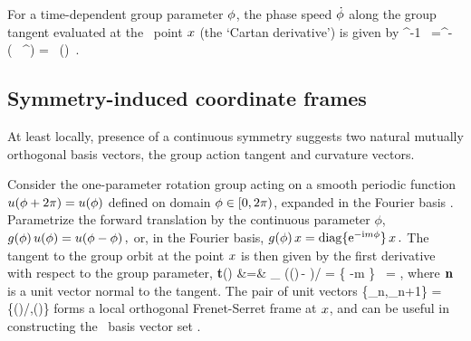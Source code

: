 													\toCB
For a time-dependent group parameter
${\bf \phi}$, the phase speed $\dot{{\bf \phi}}$ along the group tangent
evaluated at the \statesp\ point $\ssp$ (the `Cartan derivative') is
given by
\beq
\LieEl^{-1}\dot{\LieEl} \,\ssp %
     =^{-\gSpace \Lg} \,
\left( \, %
                             ^{\gSpace \Lg}\right)\ssp
    =\dot{\gSpace} \, \groupTan(\ssp)
\,.

\subsection{Symmetry-induced coordinate frames}
\label{s:symmIndCoo}

At least locally, presence of a continuous symmetry suggests two
natural mutually orthogonal basis vectors, the group action tangent and
curvature vectors.

Consider the one-parameter rotation group  acting on a smooth
periodic function $u(\gSpace + 2\pi) = u(\gSpace)$ defined on domain
$\gSpace \in [0,2\pi)$, expanded in the Fourier basis
.
Parametrize the forward
translation by the continuous parameter $\phi$,
\(
    \LieEl(\phi)\,u(\gSpace) = u(\gSpace-\phi)
\,,
\)
or, in the Fourier basis,
\(
   \LieEl(\phi) \,\ssp = \mathrm{diag}\{ \mathrm{e}^{-\mathrm{i}m\phi} \} \,\ssp
\,.
\)
The tangent to the group orbit at the point $\ssp$ is then given by
the first derivative with respect to the group parameter,
\bea
   {\bf t}(\ssp) &=&
   \lim_{\gSpace{}}
   \left(\LieEl(\gSpace)\,\ssp - \ssp\right)/\gSpace
   = \{ -m \} \, \ssp = \Lg \ssp,
\label{eq:tang}
\eea
where $\mathbf{n}$ is a unit vector normal to the tangent. The pair of unit vectors
    \PC{2011-10-28
    ``As $\Norm{\LieEl(\gSpace)\slicep}$ is a constant, for the group tangent
    vector $\Lg_\gSpace \slicep$ evaluated at $\slicep$ \refeq{eq:tang}
    $\braket{\slicep}{\Lg_\theta\,\slicep}$ vanishes ($\Lg_{\theta}$ is
    antisymmetric).''
The state vector $\ssp$ is not normal to \normVec(\ssp), as $\braket{\ssp
\Lg^2}{\ssp} = - \Norm{\groupTan(\ssp)}^2 \neq 0$, but can one use it to
produce from $\ssp$ the 3. local eigenbasis unit vector? Have not thought
that through. If we do that here, need to rewrite text leading to
\refeq{PCsectQ0}.
    }
\beq
\{{\be_n},{\be_{n+1}}\} =
\{\groupTan(\ssp)/\Norm{\groupTan(\ssp)},\normVec(\ssp)\}
forms a local orthogonal Frenet-Serret frame at $\ssp$, and can be useful
in constructing the \statesp\ basis vector set .


